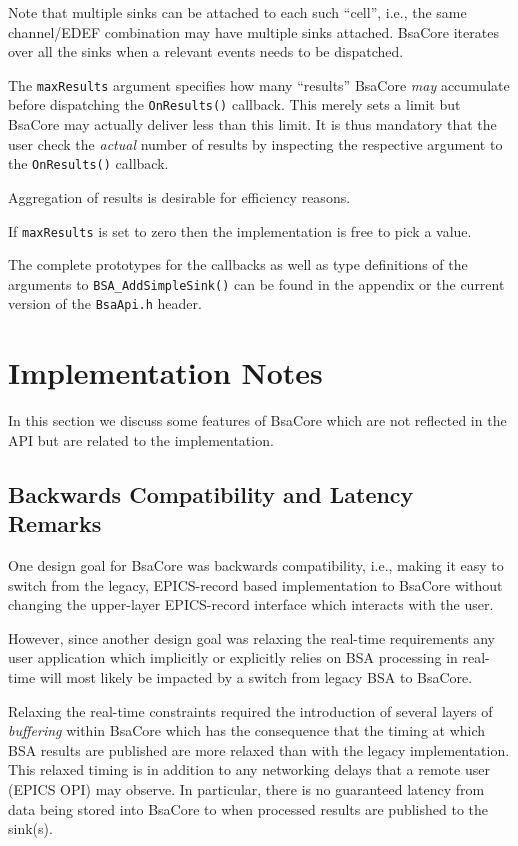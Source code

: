 \documentclass[11pt]{article}
\newcommand{\bsac}{BsaCore}
\newcommand{\bsa} {BSA}
\newcommand{\EDEF}{EDEF}
\newcommand{\cod}[1]{{\tt#1}}
\begin{document}
Note that multiple sinks can be attached to each such ``cell'', i.e., the same
channel/\EDEF{} combination may have multiple sinks attached. \bsac{} iterates
over all the sinks when a relevant events needs to be dispatched.

The \cod{maxResults} argument specifies how many ``results'' \bsac{} {\em may}
accumulate before dispatching the \cod{OnResults()} callback. This merely
sets a limit but \bsac{} may actually deliver less than this limit. It is
thus mandatory that the user check the {\em actual} number of results
by inspecting the respective argument to the \cod{OnResults()} callback.

Aggregation of results is desirable for efficiency reasons.

If \cod{maxResults} is set to zero then the implementation is free to pick
a value.

The complete prototypes for the callbacks as well as type definitions of the
arguments to \cod{BSA\_AddSimpleSink()} can be found in the appendix or the
current version of the \cod{BsaApi.h} header.

\section{Implementation Notes}
In this section we discuss some features of \bsac{} which are not reflected
in the API but are related to the implementation.
\subsection{Backwards Compatibility and Latency Remarks}
\label{sec:latency}
One design goal for \bsac{} was backwards compatibility, i.e., making it easy
to switch from the legacy, EPICS-record based implementation to \bsac{} without
changing the upper-layer EPICS-record interface which interacts with the user.

However, since another design goal was relaxing the real-time requirements
any user application which implicitly or explicitly relies on \bsa{} processing
in real-time will most likely be impacted by a switch from legacy \bsa{} to
\bsac{}.

Relaxing the real-time constraints required the introduction of several
layers of {\em buffering} within \bsac{} which has the consequence that
the timing at which \bsa{} results are published are more relaxed than
with the legacy implementation. This relaxed timing is in addition to any
networking delays that a remote user (EPICS OPI) may observe. In particular,
there is no guaranteed latency from data being stored into \bsac{} to when
processed results are published to the sink(s).
\end{document}

